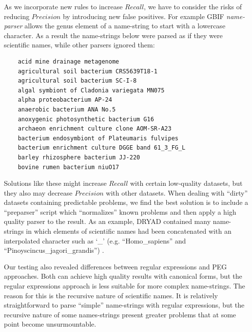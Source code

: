 \documentclass{bmcart}
\begin{document}
As we incorporate new rules to increase $Recall$, we have to consider the risks
of reducing $Precision$ by introducing new false positives. For example GBIF
\textit{name-parser} allows the genus element of a name-string to start with a
lowercase character. As a result the name-strings below were parsed as if they
were scientific names, while other parsers ignored them:

\vspace{0.5cm}

\begin{verbatim}
    acid mine drainage metagenome
    agricultural soil bacterium CRS5639T18-1
    agricultural soil bacterium SC-I-8
    algal symbiont of Cladonia variegata MN075
    alpha proteobacterium AP-24
    anaerobic bacterium ANA No.5
    anoxygenic photosynthetic bacterium G16
    archaeon enrichment culture clone AOM-SR-A23
    bacterium endosymbiont of Plateumaris fulvipes
    bacterium enrichment culture DGGE band 61_3_FG_L
    barley rhizosphere bacterium JJ-220
    bovine rumen bacterium niuO17
\end{verbatim}

\vspace{0.5cm}

Solutions like these might increase $Recall$ with certain low-quality datasets,
but they also may decrease $Precision$ with other datasets. When dealing with
``dirty'' datasets containing predictable problems, we find the best solution is
to include a ``preparser'' script which ``normalizes'' known problems  and then
apply a high quality parser to the result.  As an example, DRYAD contained many name-strings in which elements of
scientific names had been concatenated with an interpolated character such
as `\_’ (e.g. ``Homo\_sapiens'' and ``Pinoyscincus\_jagori\_grandis'')
\cite{Patterson:inpress-a}.

Our testing also revealed differences between regular expressions and PEG
approaches. Both can achieve high quality results with canonical forms, but the
regular expressions approach is less suitable for more complex name-strings.
The reason for this is the recursive nature of scientific names.  It is
relatively straightforward to parse ``simple'' name-strings with regular
expressions, but the recursive nature of some names-strings present greater
problems that at some point become unsurmountable.

\end{document}
